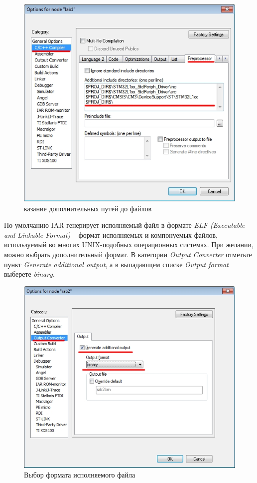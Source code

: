 \begin{figure}[H]
\begin{center}
\includegraphics[scale=0.5]{Image/11.jpg}
\end{center}

\caption{казание дополнительных путей до файлов}
\end{figure}

По умолчанию IAR генерирует исполняемый файл в формате  \textit{ELF (Executable and Linkable Format)} -- формат исполняемых и компонуемых файлов, используемый во многих UNIX-подобных операционных системах. При желании, можно выбрать дополнительный формат. В категории  \textit{Output Converter} отметьте пункт  \textit{Generate additional output}, а в выпадающем списке  \textit{Output format} выберете  \textit{binary}.

\begin{figure}[H]
\begin{center}
\includegraphics[scale=0.5]{Image/12.jpg}
\end{center}
\caption{Выбор формата исполняемого файла}
\end{figure}


